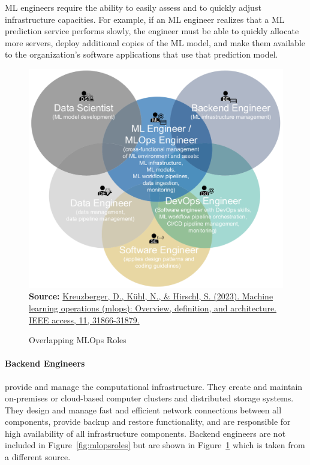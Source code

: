 ML engineers require the ability to easily assess and to quickly adjust infrastructure capacities. For example, if an ML engineer realizes that a ML prediction service performs slowly, the engineer must be able to quickly allocate more servers, deploy additional copies of the ML model, and make them available to the organization's software applications that use that prediction model. 

\begin{figure}
\centering
\includegraphics[width=.75\textwidth]{Kreuzbergeretal_fig3.png}  \\

\scriptsize \textbf{Source:} \href{https://ieeexplore.ieee.org/abstract/document/10081336}{Kreuzberger, D., K\"uhl, N., \& Hirschl, S. (2023). Machine learning operations (mlops): Overview, definition, and architecture. IEEE access, 11, 31866-31879.}
\caption{Overlapping MLOps Roles}
\label{fig:mlopsskills}
\end{figure}

\paragraph*{Backend Engineers} provide and manage the computational infrastructure. They create and maintain on-premises or cloud-based computer clusters and distributed storage systems. They design and manage fast and efficient network connections between all components, provide backup and restore functionality, and are responsible for high availability of all infrastructure components. Backend engineers are not included in Figure~\ref{fig:mlopsroles} but are shown in Figure~\ref{fig:mlopsskills} which is taken from a different source.


